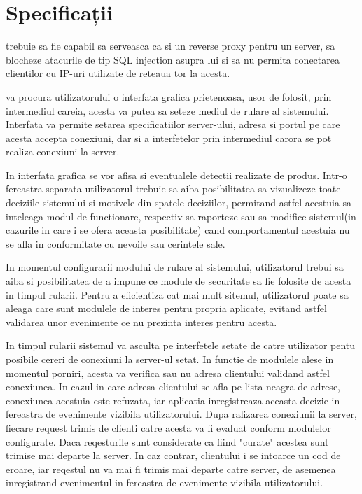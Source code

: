  \section{Specificații}
\textit{\thesistitle} trebuie sa fie capabil sa serveasca ca si un reverse proxy pentru un server, sa blocheze atacurile de tip SQL injection asupra lui si sa nu permita conectarea clientilor cu IP-uri utilizate de reteaua tor la acesta.

\textit{\thesistitle} va procura utilizatorului o interfata grafica prietenoasa, usor de folosit, prin intermediul careia, acesta va putea sa seteze mediul de rulare al sistemului. Interfata va permite setarea specificatiilor server-ului, adresa si portul pe care acesta accepta conexiuni, dar si a interfetelor prin intermediul carora se pot realiza conexiuni la server. 

In interfata grafica se vor afisa si eventualele detectii realizate de produs. Intr-o fereastra separata utilizatorul trebuie sa aiba posibilitatea sa vizualizeze toate deciziile sistemului si motivele din spatele deciziilor, permitand astfel acestuia sa inteleaga modul de functionare, respectiv sa raporteze sau sa modifice sistemul(in cazurile in care i se ofera aceasta posibilitate) cand comportamentul acestuia nu se afla in conformitate cu nevoile sau cerintele sale.

In momentul configurarii modului de rulare al sistemului, utilizatorul trebui sa aiba si posibilitatea de a impune ce module de securitate sa fie folosite de acesta in timpul rularii. Pentru a eficientiza cat mai mult sitemul, utilizatorul poate sa aleaga care sunt modulele de interes pentru propria aplicate, evitand astfel validarea unor evenimente ce nu prezinta interes pentru acesta.

 
In timpul rularii sistemul va asculta pe interfetele setate de catre utilizator pentu posibile cereri de conexiuni la server-ul setat. In functie de modulele alese in momentul porniri, acesta va verifica sau nu adresa clientului validand astfel conexiunea. In cazul in care adresa clientului se afla pe lista neagra de adrese, conexiunea acestuia este refuzata, iar aplicatia inregistreaza aceasta decizie in fereastra de evenimente vizibila utilizatorului. Dupa ralizarea conexiunii la server, fiecare request trimis de clienti catre acesta va fi evaluat conform modulelor configurate. Daca reqesturile sunt considerate ca fiind "curate" acestea sunt trimise mai departe la server. In caz contrar, clientului i se intoarce un cod de eroare, iar reqestul nu va mai fi trimis mai departe catre server, de asemenea inregistrand evenimentul in fereastra de evenimente vizibila utilizatorului.


